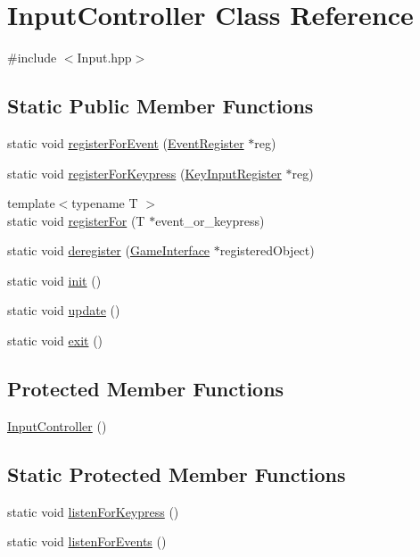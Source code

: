 \hypertarget{class_input_controller}{\section{Input\-Controller Class Reference}
\label{class_input_controller}
}


{\ttfamily \#include $<$Input.\-hpp$>$}

\subsection*{Static Public Member Functions}
\begin{DoxyCompactItemize}
\item 
static void \hyperlink{class_input_controller_a34126fbb3541313ed0b1b3eaddb0f9e7}{register\-For\-Event} (\hyperlink{class_event_register}{Event\-Register} $\ast$reg)
\item 
static void \hyperlink{class_input_controller_a0b9059be3b8f5cf7dc60bd295ffe205e}{register\-For\-Keypress} (\hyperlink{class_key_input_register}{Key\-Input\-Register} $\ast$reg)
\item 
{\footnotesize template$<$typename T $>$ }\\static void \hyperlink{class_input_controller_a3fdf7b5696eae64b76d540b35cbc94c7}{register\-For} (T $\ast$event\-\_\-or\-\_\-keypress)
\item 
static void \hyperlink{class_input_controller_a995431661911a85ae39f1591932e4e20}{deregister} (\hyperlink{class_game_interface}{Game\-Interface} $\ast$registered\-Object)
\item 
static void \hyperlink{class_input_controller_aa12eb24fffc0010eb4101c56d0b06dc5}{init} ()
\item 
static void \hyperlink{class_input_controller_ab7e7e742d0b250effa849ed2581e2eb2}{update} ()
\item 
static void \hyperlink{class_input_controller_a95e9c9c2be3a581d4e10fff159007c68}{exit} ()
\end{DoxyCompactItemize}
\subsection*{Protected Member Functions}
\begin{DoxyCompactItemize}
\item 
\hyperlink{class_input_controller_aba927fffeb0bf4c4fd0835d4dfbdfaec}{Input\-Controller} ()
\end{DoxyCompactItemize}
\subsection*{Static Protected Member Functions}
\begin{DoxyCompactItemize}
\item 
static void \hyperlink{class_input_controller_a1e87ceb31ecdcd8bb0ee1af102b20c8a}{listen\-For\-Keypress} ()
\item 
static void \hyperlink{class_input_controller_a550227f0a95207f5361354135e80d191}{listen\-For\-Events} ()
\end{DoxyCompactItemize}
